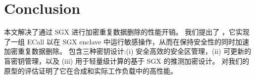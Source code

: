 \section{Conclusion}

本文解决了通过 SGX 进行加密重复数据删除的性能开销。 我们提出了 \sysname，它实现了一组 ECall 以在 SGX enclave 中运行敏感操作，从而在保持安全性的同时加速加密重复数据删除。 \sysname 包含三种密钥设计:(i) 安全高效的安全区管理，(ii) 可更新的盲密钥管理，以及 (iii) 用于轻量级计算的基于 SGX 的推测加密设计。 对我们的 \sysname 原型的评估证明了它在合成和实际工作负载中的高性能。